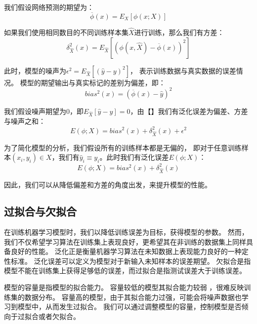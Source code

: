 我们假设网络预测的期望为：
\begin{equation}
	\label{eqt_5_3}
	\overline{\phi}(x) = E_X\left[ \phi(x; X) \right]
\end{equation}

如果我们使用相同数目的不同训练样本集$\hat{X}$进行训练，那么我们有方差：
\begin{equation}
	\label{eqt_5_4}
	\delta_{\hat{X}}^2(x) = E_{\hat{X}}\left[ (\phi(x, \hat{X}) - \overline{\phi}(x))^2\right]
\end{equation}

此时，模型的噪声为$\epsilon^2 = E_{\hat{X}}\left[ (\hat{y} - y)^2\right]$，
表示训练数据与真实数据的误差情况。
模型的期望输出与真实标记的差别为偏差，即：
\begin{equation}
	bias^2(x) = (\overline{\phi}(x)  - \hat{y})^2
\end{equation}

我们假设噪声期望为$0$，即$E_{\hat{X}}[\hat{y} - y] = 0$，由【】我们有泛化误差为偏差、方差与噪声之和：
\begin{equation}
	E(\phi; X) = bias^2(x) + \delta_{\hat{X}}^2(x) + \epsilon^2
\end{equation}

为了简化模型的分析，我们假设所有的训练样本都是无偏的，
即对于任意训练样本$(x_i, y_i) \in X$，我们有$\hat{y}_i \equiv y_i$。此时我们有泛化误差$E(\phi; X) $：
\begin{equation}
	E(\phi; X) = bias^2(x) + \delta_{\hat{X}}^2(x) 
\end{equation}

因此，我们可以从降低偏差和方差的角度出发，来提升模型的性能。

\subsection{过拟合与欠拟合}

在训练机器学习模型时，我们以降低训练误差为目标，获得模型的参数。
然而，我们不仅希望学习算法在训练集上表现良好，更希望其在非训练的数据集上同样具备良好的性能。
泛化正是衡量机器学习算法在未知数据上表现能力良好的一种定性标准。
泛化误差可以定义为模型对于新输入未知样本的误差期望。
欠拟合是指模型不能在训练集上获得足够低的误差，而过拟合是指测试误差大于训练误差。\par

模型的容量是指模型的拟合能力。
容量较低的模型其拟合能力较弱 ，很难反映训练集的数据分布。
容量高的模型，由于其拟合能力过强，可能会将噪声数据也学习到模型中，从而发生过拟合。
我们可以通过调整模型的容量，控制模型是否倾向于过拟合或者欠拟合。\par

